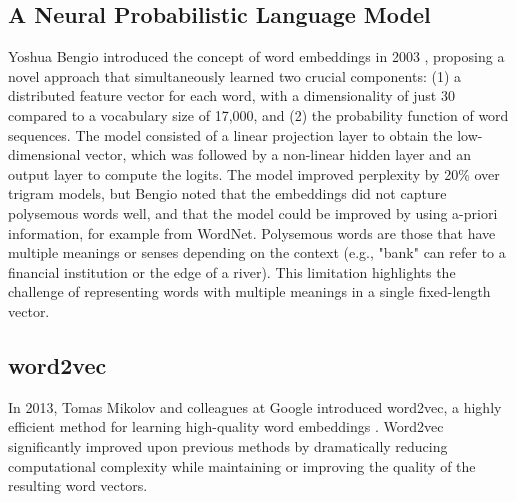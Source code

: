 \documentclass[a4paper, oneside]{discothesis}
\begin{document}

\subsection{A Neural Probabilistic Language Model}
Yoshua Bengio introduced the concept of word embeddings in 2003 \cite{bengio2003neural}, proposing a novel approach that simultaneously learned two crucial components: (1) a distributed feature vector for each word, with a dimensionality of just 30 compared to a vocabulary size of 17,000, and (2) the probability function of word sequences. 
The model consisted of a linear projection layer to obtain the low-dimensional vector, which was followed by a non-linear hidden layer and an output layer to compute the logits. The model improved perplexity by 20\% over trigram models, but Bengio noted that the embeddings did not capture polysemous words well, and that the model could be improved by using a-priori information, for example from WordNet. Polysemous words are those that have multiple meanings or senses depending on the context (e.g., "bank" can refer to a financial institution or the edge of a river). This limitation highlights the challenge of representing words with multiple meanings in a single fixed-length vector. 

\subsection{word2vec}
In 2013, Tomas Mikolov and colleagues at Google introduced word2vec, a highly efficient method for learning high-quality word embeddings \cite{mikolov2013efficient}. Word2vec significantly improved upon previous methods by dramatically reducing computational complexity while maintaining or improving the quality of the resulting word vectors.
\end{document}
